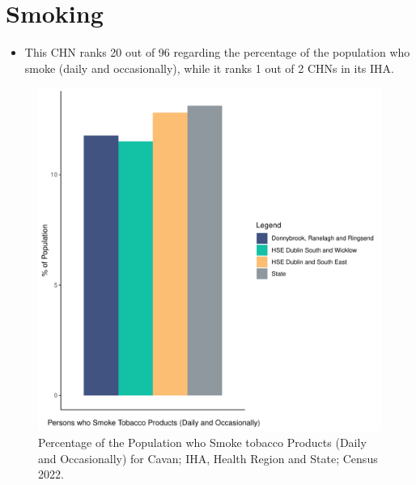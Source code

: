 \documentclass{article}
\begin{document}
\pagebreak

\section{Smoking}\label{sect:Smoking}
\begin{itemize}
\item This CHN ranks  20 out of 96 regarding the percentage of the population who smoke (daily and occasionally), while it ranks   1 out of 2 CHNs in its IHA.
\end{itemize}
\begin{figure}[H]
	\centering
	\includegraphics[width = 120mm]{../figures/SmokingED.pdf}
	\caption{Percentage of the Population who Smoke tobacco Products (Daily and Occasionally) for Cavan; IHA, Health Region and State; Census 2022.}
	\label{fig:2ae19629-1a6a-13a3-e055-000000000001}
	\end{figure}
	
\end{document}
